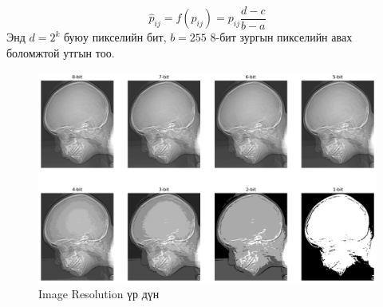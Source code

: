 \documentclass[a4paper]{article}
\begin{document}
\begin{equation}
    \hat{p}_{ij} = f(p_{ij}) = p_{ij}\frac{d - c}{b - a}
\end{equation}
Энд $d = 2^k$ буюу пикселийн бит, $b = 255$ 8-бит зургын пикселийн авах боломжтой утгын тоо.
\begin{figure}[H]
  \centering
  \includegraphics[scale = 0.35]{bit_depth.png}
  \caption[Wider Face]{Image Resolution үр дүн}
\end{figure}
\end{document}
